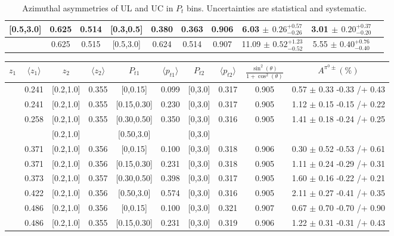 \begin{table}[H]
\begin{tabular}{|c| c| c| c| c| c| c| c| c| c|}
[0.5,3.0]	&	0.625	&	0.514	&	[0.3,0.5]	&	0.380	&	0.363	&	0.906	&	6.03	$\pm$ $	0.26	_{	-0.26	}^{+	0.57	}$&	3.01	$\pm$ $	0.20	_{	-0.20	}^{+	0.37	}$\\ \hline
[0.5,3.0]	&	0.625	&	0.515	&	[0.5,3.0]	&	0.624	&	0.514	&	0.907	&	11.09	$\pm$ $	0.52	_{	-0.52	}^{+	1.23	}$&	5.55	$\pm$ $	0.40	_{	-0.40	}^{+	0.76	}$\\ \hline
\end{tabular}
\caption{Azimuthal asymmetries of UL and UC in $P_t$ bins. Uncertainties are statistical and systematic.}
\label{tab:finalulucptbins}
\end{table}

\begin{table}[H]\scriptsize
\centering
\begin{tabular}{|c| c| c| c| c| c| c| c| c| c|}
\hline
$z_1$& $\langle  z_{1}  \rangle$ & $z_2$ & $\langle  z_{2}\rangle$& $P_{t1}$ & $\langle  p_{t1} \rangle$& $P_{t2}$ &  $\langle p_{t2}\rangle$ &$\frac{\sin^2(\theta)}{1+\cos^2(\theta)}$& $A^{\pi^0\pm}(\%)$   \\ \hline
[0.2,0.3]	&	0.241	&	[0.2,1.0]	&	0.355	&	[0,0.15]	&	0.099	&	[0,3.0]	&	0.317	&	0.905	&	0.57	$\pm$ 	0.33	-0.33	/+	0.43	\\ \hline
[0.2,0.3]	&	0.241	&	[0.2,1.0]	&	0.355	&	[0.15,0.30]	&	0.230	&	[0,3.0]	&	0.317	&	0.905	&	1.12	$\pm$ 	0.15	-0.15	/+	0.22	\\ \hline
[0.2,0.3]	&	0.258	&	[0.2,1.0]	&	0.355	&	[0.30,0.50]	&	0.350	&	[0,3.0]	&	0.316	&	0.905	&	1.41	$\pm$ 	0.18	-0.24	/+	0.25	\\ \hline
[0.2,0.3]	&		&	[0.2,1.0]	&		&	[0.50,3.0]	&		&	[0,3.0]	&		&		&							\\ \hline
 \hline
[0.3,0.5]	&	0.371	&	[0.2,1.0]	&	0.356	&	[0,0.15]	&	0.100	&	[0,3.0]	&	0.318	&	0.906	&	0.30	$\pm$ 	0.52	-0.53	/+	0.61	\\ \hline
[0.3,0.5]	&	0.371	&	[0.2,1.0]	&	0.356	&	[0.15,0.30]	&	0.231	&	[0,3.0]	&	0.318	&	0.905	&	1.11	$\pm$ 	0.24	-0.29	/+	0.31	\\ \hline
[0.3,0.5]	&	0.373	&	[0.2,1.0]	&	0.357	&	[0.30,0.50]	&	0.398	&	[0,3.0]	&	0.317	&	0.905	&	1.60	$\pm$ 	0.16	-0.22	/+	0.21	\\ \hline
[0.3,0.5]	&	0.422	&	[0.2,1.0]	&	0.356	&	[0.50,3.0]	&	0.574	&	[0,3.0]	&	0.316	&	0.905	&	2.11	$\pm$ 	0.27	-0.41	/+	0.35	\\ \hline
 \hline
[0.5,0.7]	&	0.486	&	[0.2,1.0]	&	0.356	&	[0,0.15]	&	0.100	&	[0,3.0]	&	0.321	&	0.907	&	0.67	$\pm$ 	0.70	-0.70	/+	0.90	\\ \hline
[0.5,0.7]	&	0.486	&	[0.2,1.0]	&	0.355	&	[0.15,0.30]	&	0.231	&	[0,3.0]	&	0.319	&	0.906	&	1.22	$\pm$ 	0.31	-0.31	/+	0.43	\\ \hline

\end{tabular}
\end{table}
